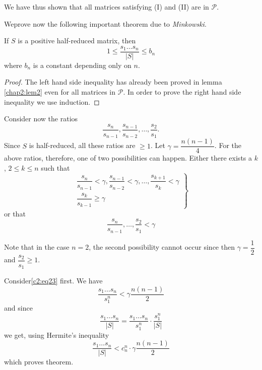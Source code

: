 We have thus shown that all matrices satisfying {\rm(I)} and {\rm(II)}
are in $\mathscr{P}$. 

We\pageoriginale prove now the following important theorem due to {\em
  Minkowski}. 

\begin{thm}\label{chap2:thm4}
If $S$ is a positive half-reduced matrix, then
$$
1\leq \frac{s_{1}\ldots s_{n}}{|S|}\leq b_{n}
$$
where $b_{n}$ is a constant depending only on $n$.
\end{thm}

\begin{proof}
The left hand side inequality has already been proved in lemma
\ref{chap2:lem2} even for all matrices in $\mathscr{P}$. In order to prove
the right hand side inequality we use induction.
\end{proof}

Consider now the ratios
$$
\frac{s_{n}}{s_{n-1}},\frac{s_{n-1}}{s_{n-2}},\ldots,\frac{s_{2}}{s_{1}}. 
$$
Since $S$ is half-reduced, all these ratios are $\geq 1$. Let
$\gamma=\dfrac{n(n-1)}{4}$. For the above ratios, therefore, one of
two possibilities can happen. Either there exists a $k$, $2\leq k\leq
n$ such that
\begin{equation*}
\left.
\begin{array}{c}
\dfrac{s_{n}}{s_{n-1}}<\gamma,
\dfrac{s_{n-1}}{s_{n-2}}<\gamma,\ldots,\dfrac{s_{k+1}}{s_{k}}<\gamma\\[10pt]
\dfrac{s_{k}}{s_{k-1}}\geq \gamma
\end{array}
\right\}\tag{22}\label{c2:eq22}
\end{equation*}
or that
\begin{equation*}
\frac{s_{n}}{s_{n-1}},\ldots,\frac{s_{2}}{s_{1}}<\gamma\tag{23}\label{c2:eq23}
\end{equation*}

Note that in the case $n=2$, the second possibility cannot occur since
then $\gamma=\dfrac{1}{2}$ and $\dfrac{s_{2}}{s_{1}}\geq 1$.

Consider\pageoriginale \eqref{c2:eq23} first. We have
$$
\frac{s_{1}\ldots s_{n}}{s_{1}^{n}}<\gamma\frac{n(n-1)}{2}
$$
and since
$$
\frac{s_{1}\ldots s_{n}}{|S|}=\frac{s_{1}\ldots s_{n}}{s^{n}_{1}}\cdot
\frac{s_{1}^{n}}{|S|} 
$$
we get, using Hermite's inequality
$$
\frac{s_{1}\ldots s_{n}}{|S|}  < c^{n}_{n}\cdot\gamma\frac{n(n-1)}{2} 
$$
which proves theorem.

